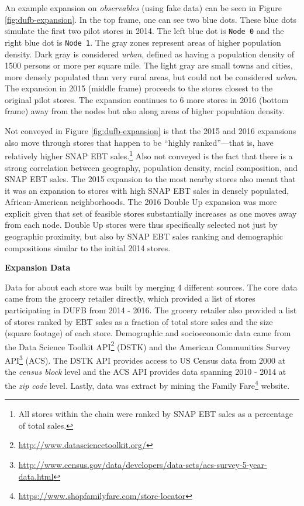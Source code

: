 \documentclass[12pt,letterpaperpaper,]{book}
\renewcommand{\href}[2]{#2\footnote{\url{#1}}}
\begin{document}
An example expansion on \emph{observables} (using fake data) can be seen
in Figure \ref{fig:dufb-expansion}. In the top frame, one can see two
blue dots. These blue dots simulate the first two pilot stores in 2014.
The left blue dot is \texttt{Node\ 0} and the right blue dot is
\texttt{Node\ 1}. The gray zones represent areas of higher population
density. Dark gray is considered \emph{urban}, defined as having a
population density of 1500 persons or more per square mile. The light
gray are small towns and cities, more densely populated than very rural
areas, but could not be considered \emph{urban}. The expansion in 2015
(middle frame) proceeds to the stores closest to the original pilot
stores. The expansion continues to 6 more stores in 2016 (bottom frame)
away from the nodes but also along areas of higher population density.

Not conveyed in Figure \ref{fig:dufb-expansion} is that the 2015 and
2016 expansions also move through stores that happen to be ``highly
ranked''---that is, have relatively higher SNAP EBT sales.\footnote{All
  stores within the chain were ranked by SNAP EBT sales as a percentage
  of total sales.} Also not conveyed is the fact that there is a strong
correlation between geography, population density, racial composition,
and SNAP EBT sales. The 2015 expansion to the most nearby stores also
meant that it was an expansion to stores with high SNAP EBT sales in
densely populated, African-American neighborhoods. The 2016 Double Up
expansion was more explicit given that set of feasible stores
substantially increases as one moves away from each node. Double Up
stores were thus specifically selected not just by geographic proximity,
but also by SNAP EBT sales ranking and demographic compositions similar
to the initial 2014 stores.

\textbf{Expansion Data}

Data for about each store was built by merging 4 different sources. The
core data came from the grocery retailer directly, which provided a list
of stores participating in DUFB from 2014 - 2016. The grocery retailer
also provided a list of stores ranked by EBT sales as a fraction of
total store sales and the size (square footage) of each store.
Demographic and socioeconomic data came from the
\href{http://www.datasciencetoolkit.org/}{Data Science Toolkit API}
(DSTK) and the
\href{http://www.census.gov/data/developers/data-sets/acs-survey-5-year-data.html}{American
Communities Survey API} (ACS). The DSTK API provides access to US Census
data from 2000 at the \emph{census block} level and the ACS API provides
data spanning 2010 - 2014 at the \emph{zip code} level. Lastly, data was
extract by mining the
\href{https://www.shopfamilyfare.com/store-locator}{Family Fare}
website.
\end{document}
